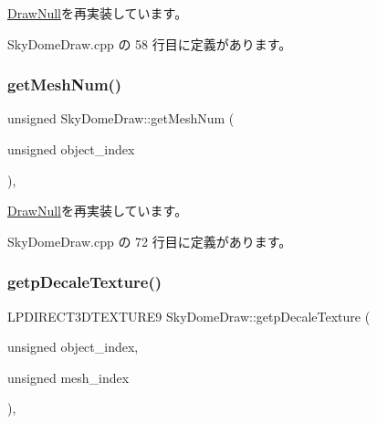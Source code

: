 \mbox{\hyperlink{class_draw_null_afe50f6fd820b18d673f70f048743f339}{Draw\+Null}}を再実装しています。



 Sky\+Dome\+Draw.\+cpp の 58 行目に定義があります。

\mbox{\label{class_sky_dome_draw_a6b281bafa71c058ee83c373ad978e3bb}} 
\subsubsection{\texorpdfstring{get\+Mesh\+Num()}{getMeshNum()}}
{\footnotesize\ttfamily unsigned Sky\+Dome\+Draw\+::get\+Mesh\+Num (\begin{DoxyParamCaption}\item[{unsigned}]{object\+\_\+index }\end{DoxyParamCaption})\hspace{0.3cm}{\ttfamily [override]}, {\ttfamily [virtual]}}



\mbox{\hyperlink{class_draw_null_a7586cc78eed6bcaf2972ad7a6a70e665}{Draw\+Null}}を再実装しています。



 Sky\+Dome\+Draw.\+cpp の 72 行目に定義があります。

\mbox{\label{class_sky_dome_draw_a99ec8e0a5aea708b66cf07c79a6449d1}} 
\subsubsection{\texorpdfstring{getp\+Decale\+Texture()}{getpDecaleTexture()}}
{\footnotesize\ttfamily L\+P\+D\+I\+R\+E\+C\+T3\+D\+T\+E\+X\+T\+U\+R\+E9 Sky\+Dome\+Draw\+::getp\+Decale\+Texture (\begin{DoxyParamCaption}\item[{unsigned}]{object\+\_\+index,  }\item[{unsigned}]{mesh\+\_\+index }\end{DoxyParamCaption})\hspace{0.3cm}{\ttfamily [override]}, {\ttfamily [virtual]}}



